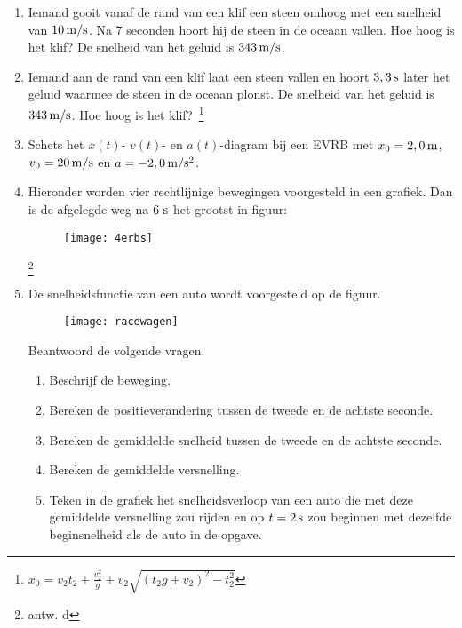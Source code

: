 \begin{enumerate}
\item Iemand gooit vanaf de rand van een klif een steen omhoog met
een snelheid van $10\rm\,m/s$. Na 7 seconden hoort hij de steen in
de oceaan vallen. Hoe hoog is het klif? De snelheid van het geluid
is $343\rm\,m/s$.

\item Iemand aan de rand van een klif laat een steen vallen en hoort
$3,3\rm\,s$ later het geluid waarmee de steen in de oceaan plonst.
De snelheid van het geluid is $343\rm\,m/s$. Hoe hoog is het
klif?~\footnote{$x_0=v_2t_2+\frac{v_2^2}{g}+v_2\sqrt{(t_2g+v_2)^2-t_2^2}$}


\item Schets het $x(t)$- $v(t)$- en $a(t)$-diagram bij een EVRB met $x_0=2,0\rm\,m$, $v_0=20\rm\,m/s$ en $a=-2,0\rm\,m/s^2$.

\item Hieronder worden vier rechtlijnige bewegingen voorgesteld in een grafiek. Dan is de afgelegde weg na $6~\rm s$ het grootst in figuur:
\begin{figure}[h]
\begin{center}
\texttt{[image: 4erbs]}
\end{center}
\end{figure}
\footnote{antw. d}


\item De snelheidsfunctie van een auto wordt voorgesteld op de figuur. 
\begin{figure}[h]
\centering
\texttt{[image: racewagen]}
\end{figure}
\newline
Beantwoord de volgende vragen.
\begin{enumerate}
\item Beschrijf de beweging. 
\item Bereken de positieverandering tussen de tweede en de achtste seconde. 
\item Bereken de gemiddelde snelheid tussen de tweede en de achtste seconde. 
\item Bereken de gemiddelde versnelling. 
\item Teken in de grafiek het snelheidsverloop van een auto die met deze gemiddelde versnelling
zou rijden en op $t=2\rm\,s$ zou beginnen met dezelfde beginsnelheid als de auto in de opgave.
\end{enumerate}




\end{enumerate}
